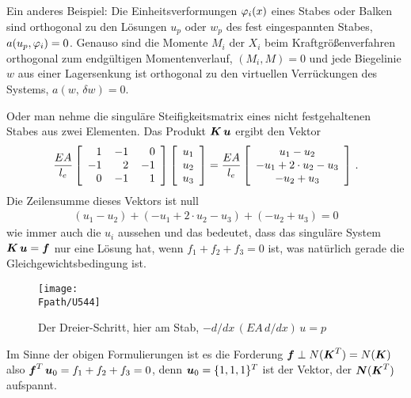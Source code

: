 Ein anderes Beispiel: Die Einheitsverformungen $\varphi_i(x)$ eines Stabes oder Balken sind orthogonal zu den L\"{o}sungen $u_p$ oder $w_p$ des fest eingespannten Stabes, $a(u_p,\varphi_i) = 0$. Genauso sind die Momente $M_i$ der $X_i$ beim Kraftgr\"{o}{\ss}enverfahren orthogonal zum endg\"{u}ltigen Momentenverlauf, $(M_i,M) = 0$ und jede Biegelinie $w$ aus einer Lagersenkung ist orthogonal zu den virtuellen Verr\"{u}ckungen des Systems, $a(w,\,\delta w) = 0$.

Oder man nehme die singul\"{a}re Steifigkeitsmatrix eines nicht festgehaltenen Stabes aus zwei Elementen. Das Produkt $\mbox{\boldmath $K$}\,\mbox{\boldmath $u$}$ ergibt den Vektor
\begin{align}
\frac{EA}{l_e}\left[ \barr {r @{\hspace{4mm}}r @{\hspace{4mm}}r}
      1  & -1 & 0\\
      -1 & 2 & -1\\
      0 &-1 & 1    \earr \right] \left[ \barr {c }
      u_1\\
      u_2\\
      u_3   \earr \right] = \frac{EA}{l_e}\left[ \barr {c }
      u_1 - u_2\\
      - u_1 + 2 \cdot u_2 - u_3\\
      -u_2 + u_3   \earr \right]\,.
\end{align}
Die Zeilensumme dieses Vektors ist null
\begin{align}
(u_1 - u_2) + (- u_1 + 2 \cdot u_2 - u_3) + (- u_2 + u_3) = 0
\end{align}
wie immer auch die $u_i$ aussehen und das bedeutet, dass das singul\"{a}re System $\mbox{\boldmath $K$}\,\mbox{\boldmath $u$} = \mbox{\boldmath $f$}$ nur eine L\"{o}sung hat, wenn $f_1 + f_2 + f_3 = 0$ ist, was nat\"{u}rlich gerade die Gleichgewichtsbedingung ist.
\begin{figure}[tbp]
\centering
\if {} \sidecaption \fi
\texttt{[image: \\Fpath/U544]}
\caption{Der Dreier-Schritt, hier am Stab, $-d/dx\,(EA\,d/dx)\, u = p$} \label{U544}
\end{figure}%

Im Sinne der obigen Formulierungen ist es die Forderung $\mbox{\boldmath $f$} \perp N(\mbox{\boldmath $K$}^T) = N(\mbox{\boldmath $K$})$ also $\mbox{\boldmath $f$}^T\,\mbox{\boldmath $u$}_0 = f_1 + f_2 + f_3 = 0$, denn $\mbox{\boldmath $u$}_0 = \{1,1,1\}^T$ ist der Vektor, der $\mbox{\boldmath $N$}(\mbox{\boldmath $K$}^T)$ aufspannt.

